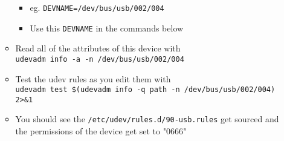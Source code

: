 \documentclass[11pt]{article}
\begin{document}
\begin{itemize}
\begin{itemize}
\begin{itemize}
\item eg. \verb~DEVNAME=/dev/bus/usb/002/004~
\item Use this \verb~DEVNAME~ in the commands below
\end{itemize}
\item Read all of the attributes of this device with\\
      \verb~udevadm info -a -n /dev/bus/usb/002/004~
\item Test the udev rules as you edit them with\\
      \verb~udevadm test $(udevadm info -q path -n /dev/bus/usb/002/004) 2>&1~
\item You should see the \verb~/etc/udev/rules.d/90-usb.rules~ get sourced
and the permissions of the device get set to "0666"
\end{itemize}
\end{itemize}
\end{document}
